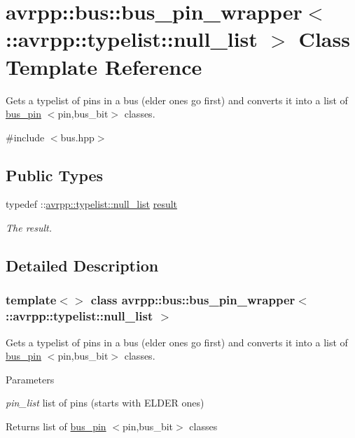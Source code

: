 \hypertarget{classavrpp_1_1bus_1_1bus__pin__wrapper_3_01_1_1avrpp_1_1typelist_1_1null__list_01_4}{
\section{avrpp::bus::bus\_\-pin\_\-wrapper$<$ ::avrpp::typelist::null\_\-list $>$ Class Template Reference}
\label{classavrpp_1_1bus_1_1bus__pin__wrapper_3_01_1_1avrpp_1_1typelist_1_1null__list_01_4}
}


Gets a typelist of pins in a bus (elder ones go first) and converts it into a list of \hyperlink{structavrpp_1_1bus_1_1bus__pin}{bus\_\-pin} $<$pin,bus\_\-bit$>$ classes.  




{\ttfamily \#include $<$bus.hpp$>$}

\subsection*{Public Types}
\begin{DoxyCompactItemize}
\item 
typedef ::\hyperlink{structavrpp_1_1typelist_1_1null__list}{avrpp::typelist::null\_\-list} \hyperlink{classavrpp_1_1bus_1_1bus__pin__wrapper_3_01_1_1avrpp_1_1typelist_1_1null__list_01_4_a9bcdb8ea663de17068e26e9eeb9419b8}{result}
\begin{DoxyCompactList}\small\item\em The result. \item\end{DoxyCompactList}\end{DoxyCompactItemize}


\subsection{Detailed Description}
\subsubsection*{template$<$$>$ class avrpp::bus::bus\_\-pin\_\-wrapper$<$ ::avrpp::typelist::null\_\-list $>$}

Gets a typelist of pins in a bus (elder ones go first) and converts it into a list of \hyperlink{structavrpp_1_1bus_1_1bus__pin}{bus\_\-pin} $<$pin,bus\_\-bit$>$ classes. 
\begin{DoxyParams}{Parameters}
\item[{\em pin\_\-list}]list of pins (starts with ELDER ones) \end{DoxyParams}
\begin{DoxyReturn}{Returns}
list of \hyperlink{structavrpp_1_1bus_1_1bus__pin}{bus\_\-pin} $<$pin,bus\_\-bit$>$ classes 
\end{DoxyReturn}


